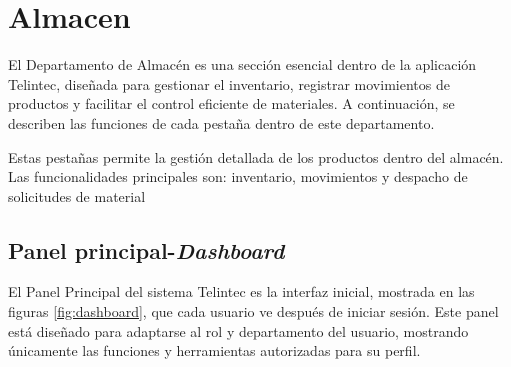 \chapter{Almacen}
\begin{justify}
    El Departamento de Almacén es una sección esencial dentro de la aplicación Telintec, diseñada para gestionar el inventario, registrar movimientos de productos y facilitar el control eficiente de materiales. A continuación, se describen las funciones de cada pestaña dentro de este departamento. 
\end{justify}
\begin{justify}
Estas pestañas permite la gestión detallada de los productos dentro del almacén. Las funcionalidades principales son: inventario, movimientos  y despacho de solicitudes de material
\end{justify}


\newpage
\pagestyle{fancy}

\section{Panel principal-\textit{Dashboard}}
\begin{justify}
    El Panel Principal del sistema Telintec es la interfaz inicial, mostrada en las figuras \ref{fig:dashboard}, que cada usuario ve después de iniciar sesión. Este panel está diseñado para adaptarse al rol y departamento del usuario, mostrando únicamente las funciones y herramientas autorizadas para su perfil. 
\end{justify}


